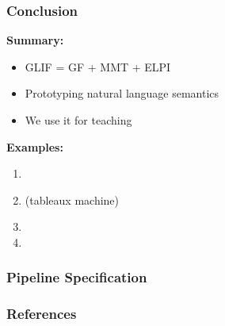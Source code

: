 \documentclass[aspectratio=169]{beamer}
\begin{document}
% 




\begin{frame}
    \frametitle{Conclusion}
    \begin{minipage}[t]{0.5\textwidth}
        \textbf{Summary:}
        \begin{itemize}
            \item GLIF = GF + MMT + ELPI
            \item Prototyping natural language semantics%
            \item We use it for teaching
        \end{itemize}
    \end{minipage}
    \begin{minipage}[t]{0.49\textwidth}
        \textbf{Examples:}
        \begin{enumerate}
            \item {}
            \item {} (tableaux machine)
            \item {}
            \item {}
        \end{enumerate}
    \end{minipage}
    
    \vspace{1em}
    \centering
    
\end{frame}

\appendix

\begin{frame}
    \frametitle{Pipeline Specification}
    
\end{frame}



\begin{frame}[allowframebreaks,t]
    \frametitle{References}
    \printbibliography
\end{frame}
\end{document}
